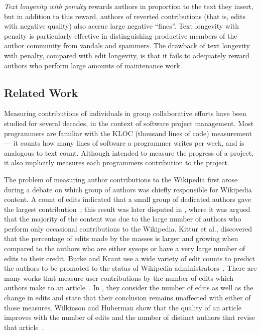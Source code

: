 {\em Text longevity with penalty\/} rewards authors in proportion to
the text they insert, but in addition to this reward, authors of
reverted contributions (that is, edits with negative quality) also
accrue large negative ``fines''. 
Text longevity with penalty is particularly effective in
distinguishing productive members of the author community from vandals
and spammers. 
The drawback of text longevity with penalty, compared with edit
longevity, is that it fails to adequately reward authors who perform
large amounts of maintenance work. 

\subsection*{Related Work}

Measuring contributions of individuals in group collaborative
efforts have been studied for several decades, in the context of
software project management.
Most programmers are familiar with the KLOC (thousand lines of 
code) measurement~\cite{MITRE1988, SLOC1992} ---
it counts how many lines of software a programmer
writes per week, and is analogous to text count.
Although intended to measure the progress of a project, it also implicitly 
measures each programmers contribution to the project.

The problem of measuring author contributions to the Wikipedia first
arose during a debate on which group of authors was chiefly
responsible for Wikipedia content. 
A count of edits indicated that a small group of dedicated authors
gave the largest contribution~\cite{Wales2005}; this result was later
disputed in \cite{Swartz2006}, where it was argued that the majority
of the content was due to the large number of authors who perform only
occasional contributions to the Wikipedia. 
Kittur et al., \cite{Bourgeoisie2007} discovered that the
percentage of edits made by the masses is larger and growing 
when compared to the authors who are either sysops or have a 
very large number of edits to their credit.
Burke and Kraut use a wide variety of edit counts to predict
the authors to be promoted to the status of Wikipedia 
administrators~\cite{AdministratorMop2008}.
There are many works that measure user contributions by the
number of edits which authors make to an 
article~\cite{Wales2005,EditsEqQuality2007,Bourgeoisie2007,
WikiDashboard2008,OrtegaBarahona2007,SteinHess2007}.
In \cite{Bourgeoisie2007}, they consider the number of edits
as well as the change in edits and state that their conclusion
remains unaffected with either of those measures.
Wilkinson and Huberman show that the quality of an article improves
with the number of edits and the number of distinct authors that 
revise that article~\cite{EditsEqQuality2007}.


